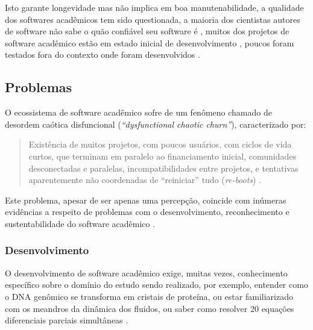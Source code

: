 Isto garante longevidade mas não implica em boa manutenabilidade, a qualidade
dos softwares acadêmicos tem sido questionada, a maioria dos cientistas autores
de software não sabe o quão confiável seu software é
\cite{Merali2010Computational}, muitos dos projetos de software acadêmico estão
em estado inicial de desenvolvimento \cite{marshall2013tools}, poucos foram
testados fora do contexto onde foram desenvolvidos \cite{Portillo12}.

\subsection{Problemas}


O ecossistema de software acadêmico sofre de um fenômeno chamado de  
desordem caótica disfuncional ({\it ``dysfunctional chaotic
churn''}), caracterizado por:

\begin{quote}
Existência de muitos projetos, com poucos usuários, com
ciclos de vida curtos, que terminam em paralelo ao financiamento inicial,
comunidades desconectadas e paralelas, incompatibilidades entre projetos, e
tentativas aparentemente não coordenadas de ``reiniciar'' tudo ({\it re-boots})
\cite{howison2015understanding}.
\end{quote}

Este problema, apesar de ser apenas uma percepção, coincide com inúmeras
evidências a respeito de problemas com o desenvolvimento, reconhecimento e
sustentabilidade do software acadêmico \cite{allen2017engineering}.


\subsubsection{Desenvolvimento}

O desenvolvimento de software acadêmico exige, muitas vezes, conhecimento
específico sobre o domínio do estudo sendo realizado,
por exemplo, entender como o DNA genômico
se transforma em cristais de proteína, ou estar familiarizado com os meandros
da dinâmica dos fluidos, ou saber como resolver 20 equações diferenciais
parciais simultâneas \cite{segal2008developing}.


